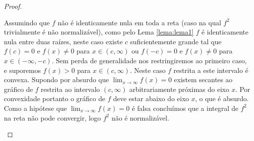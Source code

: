 \documentclass[a4paper, 12pt, notitlepage]{article}
\begin{document}
\begin{enumerate}
\begin{proof}
\begin{itemize}
      Assumindo que $f$ não é identicamente nula em toda a reta (caso na qual $f^2$ trivialmente é não normalizável), como pelo Lema \ref{lema:lema1} $f$ é identicamente nula entre duas raízes, neste caso existe $c$ suficientemente grande tal que $f(c) = 0$ e $f(x) \neq 0$ para $x \in (c, \infty)$ ou $f(-c) = 0$ e $f(x) \neq 0$ para $x \in (-\infty, -c)$. Sem perda de generalidade nos restringiremos ao primeiro caso, e suporemos $f(x) > 0$ para $x \in (c, \infty)$. Neste caso $f$ restrita a este intervalo é convexa. Supondo por absurdo que $\lim_{x \to \infty} f(x) = 0$ existem secantes ao gráfico de $f$ restrita ao intervalo $(c, \infty)$ arbitrariamente próximas do eixo $x$. Por convexidade portanto o gráfico de $f$ deve estar abaixo do eixo $x$, o que é absurdo. Como a hipótese que $\lim_{x \to \infty} f(x) = 0$ é falsa concluímos que a integral de $f^2$ na reta não pode convergir, logo $f^2$ não é normalizável.
    \end{itemize}
  \end{proof}

\end{enumerate}
\end{document}
